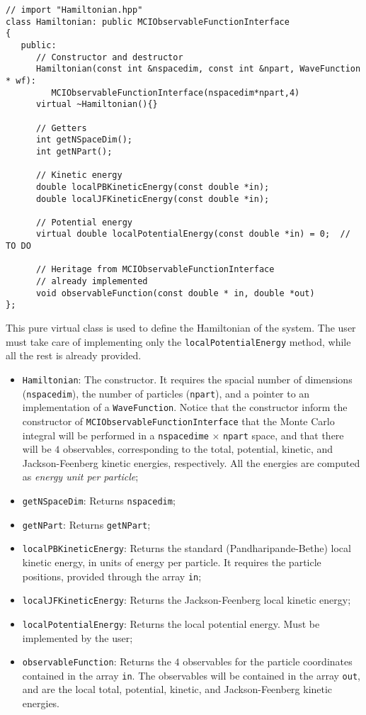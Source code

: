 \documentclass[11pt,a4paper,twoside]{article}
\begin{document}
\begin{lstlisting}
// import "Hamiltonian.hpp"
class Hamiltonian: public MCIObservableFunctionInterface
{
   public:
      // Constructor and destructor
      Hamiltonian(const int &nspacedim, const int &npart, WaveFunction * wf):
         MCIObservableFunctionInterface(nspacedim*npart,4)
      virtual ~Hamiltonian(){}

      // Getters
      int getNSpaceDim();
      int getNPart();

      // Kinetic energy
      double localPBKineticEnergy(const double *in);
      double localJFKineticEnergy(const double *in);

      // Potential energy
      virtual double localPotentialEnergy(const double *in) = 0;  // TO DO

      // Heritage from MCIObservableFunctionInterface
      // already implemented
      void observableFunction(const double * in, double *out)
};
\end{lstlisting}

This pure virtual class is used to define the Hamiltonian of the system.
The user must take care of implementing only the \verb+localPotentialEnergy+ method, while all the rest is already provided.

\begin{itemize}
\item \verb+Hamiltonian+: The constructor. It requires the spacial number of dimensions (\verb+nspacedim+), the number of particles (\verb+npart+), and a pointer to an implementation of a \verb+WaveFunction+. Notice that the constructor inform the constructor of \verb+MCIObservableFunctionInterface+ that the Monte Carlo integral will be performed in a \verb+nspacedime+ $\times$ \verb+npart+ space, and that there will be $4$ observables, corresponding to the total, potential, kinetic, and Jackson-Feenberg kinetic energies, respectively. All the energies are computed as \emph{energy unit per particle};
\item \verb+getNSpaceDim+: Returns \verb+nspacedim+;
\item \verb+getNPart+: Returns \verb+getNPart+;
\item \verb+localPBKineticEnergy+: Returns the standard (Pandharipande-Bethe) local kinetic energy, in units of energy per particle. It requires the particle positions, provided through the array \verb+in+;
\item \verb+localJFKineticEnergy+: Returns the Jackson-Feenberg local kinetic energy;
\item \verb+localPotentialEnergy+: Returns the local potential energy. Must be implemented by the user;
\item \verb+observableFunction+: Returns the $4$ observables for the particle coordinates contained in the array \verb+in+. The observables will be contained in the array \verb+out+, and are the local total, potential, kinetic, and Jackson-Feenberg kinetic energies.
\end{itemize}
\end{document}
